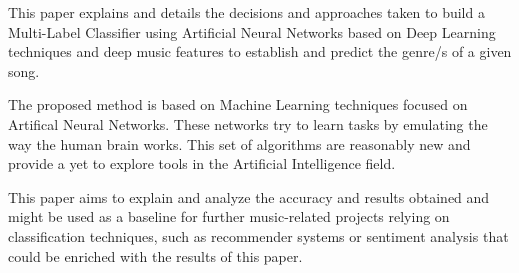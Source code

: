 This paper explains and details the decisions and approaches taken to build a Multi-Label Classifier using Artificial Neural Networks based on Deep Learning techniques and deep music features to establish and predict the genre/s of a given song. 

The proposed method is based on Machine Learning techniques focused on Artifical Neural Networks. These networks try to learn tasks by emulating the way the human brain works. This set of algorithms are reasonably new and provide a yet to explore tools in the Artificial Intelligence field.

This paper aims to explain and analyze the accuracy and results obtained and might be used as a baseline for further music-related projects relying on classification techniques, such as recommender systems or sentiment analysis that could be enriched with the results of this paper.